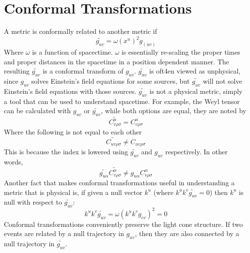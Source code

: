 \documentclass[10pt]{article}
\begin{document}
              	\section{Conformal Transformations }\label{sec:class_style}
              		 A metric is conformally related to another metric if
              		 \begin{equation}
              		 \widetilde{g_{uv}}=\omega(x^u)^2g_(uv)
              		 \end{equation}
              		 Where \(\omega\) is a function of spacectime. \(\omega\) is essentially re-scaling the proper times and proper distances in the spacetime in a position dependent manner. The resulting \(\widetilde{g_{uv}}\) is a conformal transform of \(g_{uv}\).
              	\(\widetilde{g_{uv}}\) is oft4en viewed as unphysical, since \(g_{uv}\) solves Einstein's field equations for some sources, but 	\(\widetilde{g_{uv}}\) will not solve Einstein's field equations with those sources. 	\(\widetilde{g_{uv}}\) is not a physical metric, simply a tool that can be used to understand spacetime.
              		 For example, the Weyl tensor can be calculated with \(g_{uv}\) or 	\(\widetilde{g_{uv}}\), while both options are equal, they are noted by 
              		  \begin{equation}
              		\widetilde{C^u_{v\rho\sigma}}=C^u_{v\rho\sigma}
              		 \end{equation}
              		 Where the following is not equal to each other
              		   \begin{equation}
              		\widetilde{C_{uv\rho\sigma}}\neq{C_{uv\rho\sigma}}
              		 \end{equation}
              		 This is because the index is lowered using	\(\widetilde{g_{uv}}\) and \(g_{uv}\) respectively. In other words, 
              		  \begin{equation}
              	 \widetilde{g_{u\alpha}}\widetilde{C^\alpha_{v\rho\sigma}}\neq{g_{u\alpha}C^\alpha_{v\rho\sigma}}
              		 \end{equation}
              		  	Another fact that makes conformal transformations useful in understanding a metric that is physical is, if given a null vector \(k^u\) (where \(k^uk^v\widetilde{g_{uv}}=0\)) then \(k^u\) is null with respect to \(\widetilde{g_{uv}}\):
              		  		 \begin{equation}
              		 k^uk^v\widetilde{g_{uv}}=\omega(k^uk^vg_{ev})^2=0
              		 \end{equation}
              		 Conformal transformations conveniently preserve the light cone structure. If two events are related by a null trajectory in \({g_{uv}}\), then they are also connected by a null trajectory in 	\(\widetilde{g_{uv}}\). 
              		 
\end{document}
